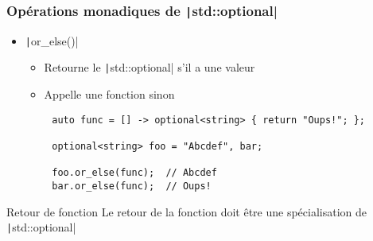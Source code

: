 \documentclass[C++.tex]{subfiles}
\begin{document}
\begin{frame}[fragile]
	\frametitle{Opérations monadiques de \texttt|std::optional|}
	\begin{itemize}
		\item \texttt|or_else()|
		\begin{itemize}
			\item Retourne le \texttt|std::optional| s'il a une valeur
			\item Appelle une fonction sinon
		\end{itemize}
	\end{itemize}

	\begin{verbatim}
		auto func = [] -> optional<string> { return "Oups!"; };

		optional<string> foo = "Abcdef", bar;

		foo.or_else(func);  // Abcdef
		bar.or_else(func);  // Oups!
	\end{verbatim}

	\begin{alertblock}{Retour de fonction}
		Le retour de la fonction doit être une spécialisation de \texttt|std::optional|
	\end{alertblock}


\end{frame}
\end{document}
